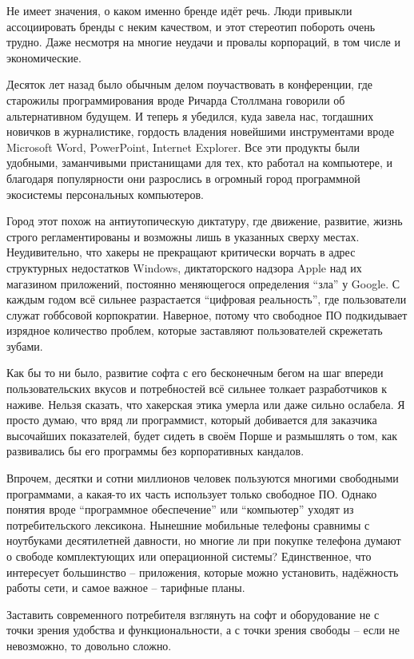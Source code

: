 Не имеет значения, о каком именно бренде идёт речь. Люди привыкли
ассоциировать бренды с неким качеством, и этот стереотип побороть
очень трудно. Даже несмотря на многие неудачи и провалы корпораций,
в том числе и экономические.

Десяток лет назад было обычным делом поучаствовать в конференции,
где старожилы программирования вроде Ричарда Столлмана говорили
об альтернативном будущем. И теперь я убедился, куда завела нас,
тогдашних новичков в журналистике, гордость владения новейшими
инструментами вроде Microsoft Word, PowerPoint, Internet Explorer. Все
эти продукты были удобными, заманчивыми пристанищами для тех, кто
работал на компьютере, и благодаря популярности они разрослись в
огромный город программной экосистемы персональных компьютеров.

Город этот похож на антиутопическую диктатуру, где движение, развитие,
жизнь строго регламентированы и возможны лишь в указанных сверху
местах. Неудивительно, что хакеры не прекращают критически ворчать
в адрес структурных недостатков Windows, диктаторского надзора Apple
над их магазином приложений, постоянно меняющегося определения ``зла''
у Google. С каждым годом всё сильнее разрастается ``цифровая реальность'',
где пользователи служат гоббсовой корпократии. Наверное, потому что
свободное ПО подкидывает изрядное количество проблем, которые
заставляют пользователей скрежетать зубами.

Как бы то ни было, развитие софта с его бесконечным бегом на шаг
впереди пользовательских вкусов и потребностей всё сильнее толкает
разработчиков к наживе. Нельзя сказать, что хакерская этика умерла или
даже сильно ослабела. Я просто думаю, что вряд ли программист,
который добивается для заказчика высочайших показателей, будет
сидеть в своём Порше и размышлять о том, как развивались бы его
программы без корпоративных кандалов.

Впрочем, десятки и сотни миллионов человек пользуются многими
свободными программами, а какая-то их часть использует только
свободное ПО. Однако понятия вроде ``программное обеспечение''
или ``компьютер'' уходят из потребительского лексикона. Нынешние
мобильные телефоны сравнимы с ноутбуками десятилетней давности,
но многие ли при покупке телефона думают о свободе комплектующих
или операционной системы? Единственное, что интересует большинство
-- приложения, которые можно установить, надёжность работы сети, и
самое важное -- тарифные планы.

Заставить современного потребителя взглянуть на софт и оборудование
не с точки зрения удобства и функциональности, а с точки зрения свободы
-- если не невозможно, то довольно сложно.


